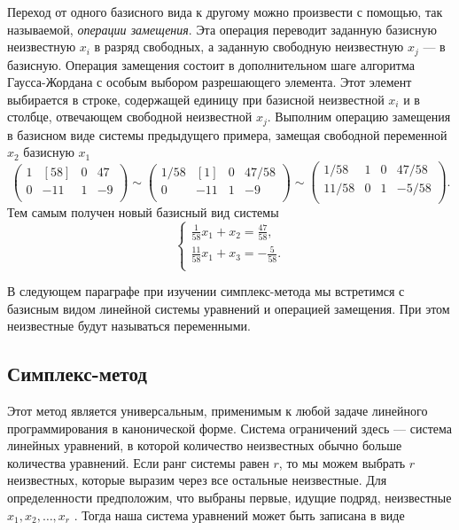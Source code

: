 Переход от одного базисного вида к другому можно произвести с помощью, так называемой, \textit{операции замещения}. Эта операция переводит заданную базисную неизвестную $x_i$ в разряд свободных, а заданную свободную неизвестную $x_j$ — в базисную. Операция замещения состоит в дополнительном шаге алгоритма Гаусса-Жордана с особым выбором разрешающего элемента. Этот элемент выбирается в строке, содержащей единицу при базисной неизвестной $x_i$ и в столбце, отвечающем свободной неизвестной $x_j$. Выполним операцию замещения в базисном виде системы предыдущего примера, замещая свободной переменной  $x_2$ базисную $x_1$
$$\left(\begin{array}{rrr|r}
1&[58]\!&0&47\\
0&-11&1&-9\\
\end{array}\right)
\sim \left(\begin{array}{rrr|r}
1/58&[1]\!&0&47/58\\
0&-11&1&-9\\
\end{array}\right)
\sim \left(\begin{array}{rrr|r}
1/58&1&0&47/58\\
11/58&0&1&-5/58\\
\end{array}\right).$$
Тем самым получен новый базисный вид системы
\begin{equation*}
\begin{cases}
\frac{1}{58}x_1+  x_2 = \frac{47}{58},\\
\frac{11}{58}x_1+ x_3 = -\frac{5}{58}.\\
\end{cases}
\end{equation*}

В следующем параграфе при изучении симплекс-метода мы встретимся с базисным видом линейной системы уравнений и операцией замещения. При этом неизвестные будут называться переменными.



\subsection{Симплекс-метод}
Этот метод является универсальным, применимым к любой задаче линейного программирования в канонической форме. Система ограничений здесь — система линейных уравнений, в которой количество неизвестных обычно  больше  количества  уравнений. Если  ранг  системы равен $r$, то мы можем выбрать $r$ неизвестных, которые выразим через все остальные неизвестные. Для определенности предположим, что выбраны  первые, идущие подряд, неизвестные $x_1,x_2,\dots,x_r$ . Тогда наша система уравнений может быть записана в виде

